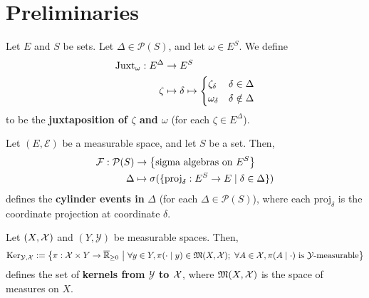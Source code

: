 \section{Preliminaries}

\begin{definition}[Juxtaposition]
    \label{def:juxtaposition}
    \leanok

    Let $E$ and $S$ be sets. Let $\Delta\in\mathcal{P}(S)$, and let $\omega\in E^S$. We define
    \begin{align}
        \operatorname{Juxt}_{\omega} : E^\Delta&\to E^S\\
        \zeta&\mapsto \delta\mapsto\begin{cases}
            \zeta_\delta & \delta\in\Delta\\
            \omega_\delta & \delta\notin\Delta
        \end{cases}
    \end{align}
    to be the \textbf{juxtaposition of $\zeta$ and $\omega$} (for each $\zeta\in E^\Delta$).
\end{definition}

\begin{definition}
    \label{def:cylinder-event}
    \leanok

    Let $(E,\mathcal{E})$ be a measurable space, and let $S$ be a set. Then,
    \begin{align}
        \mathcal{F}:\mathcal{P}(S)&\to \left\{ \text{sigma algebras on } E^S \right\}\\
        \Delta&\mapsto \sigma(\{\text{proj}_\delta:E^S\to E\mid \delta\in \Delta\})
    \end{align}
    defines the \textbf{cylinder events in }$\Delta$ (for each $\Delta\in\mathcal{P}(S)$),
    where each $\text{proj}_\delta$ is the coordinate projection at coordinate $\delta$.
\end{definition}

\begin{definition}[Kernel]
    \label{def:kernel}
    \leanok

    Let $(X,\mathcal X)$ and $(Y,\mathcal{Y})$ be measurable spaces. Then,
    \begin{equation*}
        \text{Ker}_{\mathcal{Y},\mathcal X}:=\left\{\pi:\mathcal X\times Y\to\overline{\mathbb{R}}_{\geq0}~\middle\vert~ \forall y\in Y,\pi(\cdot\mid y)\in\mathfrak{M}(X,\mathcal X);~\forall A\in\mathcal X,\pi(A\mid\cdot)\text{ is }\mathcal{Y}\text{-measurable}\right\}
    \end{equation*}
    defines the set of \textbf{kernels from $\mathcal{Y}$ to $\mathcal X$}, where $\mathfrak{M}(X,\mathcal X)$ is the space of measures on $X$.

\end{definition}

